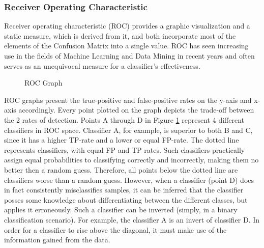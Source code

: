 		
		\subsubsection{Receiver Operating Characteristic}
		Receiver operating characteristic (ROC) provides a graphic visualization and a static measure, which is derived from it, and both incorporate most of the elements of the Confusion Matrix into a single value. ROC has seen increasing use in the fields of Machine Learning and Data Mining in recent years and often serves as an unequivocal measure for a classifier's effectiveness.
		
		\begin{figure}[H]
			\centering
			\footnotesize
			\scalebox{1}{}
			\captionsetup{width=0.8\textwidth}
			\caption{ROC Graph}
			\label{fig:roc}
		\end{figure}
	
		ROC graphs present the true-positive and false-positive rates on the y-axis and x-axis accordingly. Every point plotted on the graph depicts the trade-off between the 2 rates of detection. Points A through D in Figure \ref{fig:roc} represent 4 different classifiers in ROC space. Classifier A, for example, is superior to both B and C, since it has a higher TP-rate and a lower or equal FP-rate. The dotted line represents classifiers, with equal FP and TP rates. Such classifiers practically assign equal probabilities to classifying correctly and incorrectly, making them no better then a random guess. Therefore, all points below the dotted line are classifiers worse than a random guess. However, when a classifier (point D) does in fact consistently misclassifies samples, it can be inferred that the classifier posses some knowledge about differentiating between the different classes, but applies it erroneously. Such a classifier can be inverted (simply, in a binary classification scenario). For example, the classifier A is an invert of classifier D. In order for a classifier to rise above the diagonal, it must make use of the information gained from the data.
			
